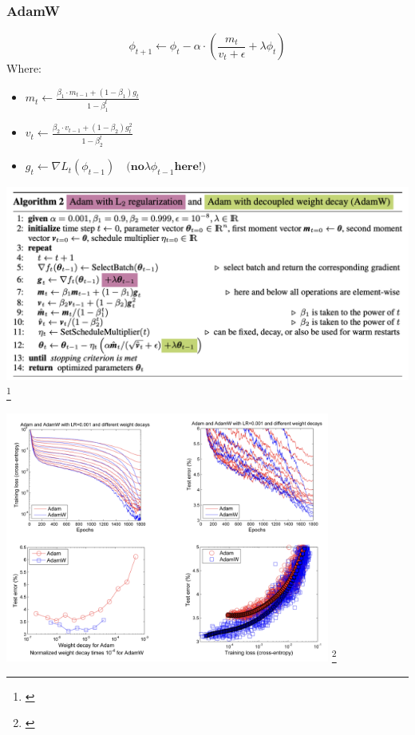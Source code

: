 \documentclass[serif]{beamer}  %
\begin{document}
\begin{frame}
\frametitle{AdamW}
$$
\phi_{t+1} \leftarrow \phi_t - \alpha \cdot (\frac{m_t}{v_t + \epsilon} + \lambda \phi_t)
$$
\vspace{0.5cm}
Where:
\begin{itemize}
	\item $m_t \leftarrow \frac{\beta_1 \cdot m_{t-1} + (1-\beta_1)g_t}{1 - \beta_1^t}$
	\item $v_t \leftarrow \frac{\beta_2 \cdot v_{t-1} + (1-\beta_2)g_t^2}{1 - \beta_2^t}$
	\item $g_t \leftarrow \nabla L_t(\phi_{t-1}) \quad  \mathbf{ (no  }\lambda \phi_{t-1} \mathbf{  here!)}$
\end{itemize}
\end{frame}

\begin{frame}
\centering
\includegraphics[width=\textwidth]{images/adamw_algo.png}
\footnote{\cite{loshchilov2019decoupledweightdecayregularization}}
\end{frame}

\begin{frame}
\centering
\includegraphics[width=0.8\textwidth]{images/adamw_com.png}
\footnote{\cite{loshchilov2019decoupledweightdecayregularization}}
\end{frame}
\end{document}
